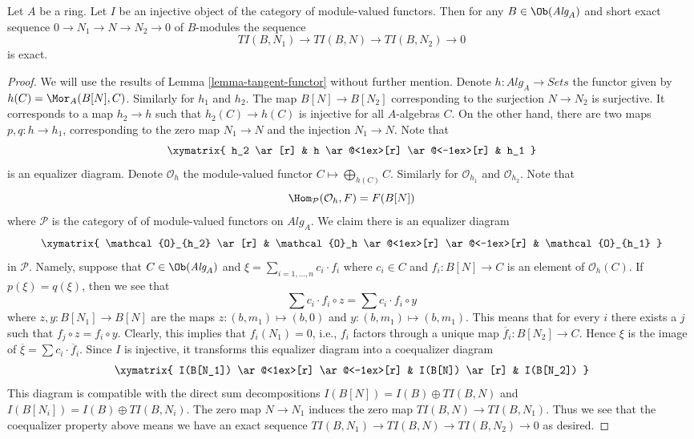 \begin{lemma}
\label{lemma-tangent-injective}
Let $A$ be a ring. Let $I$ be an injective object of the category
of module-valued functors. Then for any $B \in \Ob(\textit{Alg}_A)$
and short exact sequence
$0 \to N_1 \to N \to N_2 \to 0$
of $B$-modules the sequence
$$
TI(B, N_1) \to TI(B, N) \to TI(B, N_2) \to 0
$$
is exact.
\end{lemma}

\begin{proof}
We will use the results of
Lemma \ref{lemma-tangent-functor}
without further mention.
Denote $h : \textit{Alg}_A \to \textit{Sets}$ the functor given by
$h(C) = \Mor_A(B[N], C)$. Similarly for $h_1$ and $h_2$.
The map $B[N] \to B[N_2]$ corresponding to the surjection $N \to N_2$
is surjective. It corresponds to a map $h_2 \to h$ such that
$h_2(C) \to h(C)$ is injective for all $A$-algebras $C$. On the other
hand, there are two maps $p, q : h \to h_1$, corresponding to the
zero map $N_1 \to N$ and the injection $N_1 \to N$. Note that
$$
\xymatrix{
h_2 \ar[r] & h \ar@<1ex>[r] \ar@<-1ex>[r] & h_1
}
$$
is an equalizer diagram. Denote $\mathcal{O}_h$ the module-valued functor
$C \mapsto \bigoplus_{h(C)} C$. Similarly for $\mathcal{O}_{h_1}$ and
$\mathcal{O}_{h_2}$. Note that
$$
\Hom_\mathcal{P}(\mathcal{O}_h, F) = F(B[N])
$$
where $\mathcal{P}$ is the category of of module-valued functors on
$\textit{Alg}_A$. We claim there is an equalizer diagram
$$
\xymatrix{
\mathcal{O}_{h_2} \ar[r] &
\mathcal{O}_h \ar@<1ex>[r] \ar@<-1ex>[r] &
\mathcal{O}_{h_1}
}
$$
in $\mathcal{P}$. Namely, suppose that $C \in \Ob(\textit{Alg}_A)$
and $\xi = \sum_{i = 1, \ldots, n} c_i \cdot f_i$ where $c_i \in C$ and
$f_i : B[N] \to C$ is an element of
$\mathcal{O}_h(C)$. If $p(\xi) = q(\xi)$, then
we see that
$$
\sum c_i \cdot f_i \circ z = \sum c_i \cdot f_i \circ y
$$
where $z, y : B[N_1] \to B[N]$ are the maps $z : (b, m_1) \mapsto (b, 0)$
and $y : (b, m_1) \mapsto (b, m_1)$. This means that for every $i$
there exists a $j$ such that $f_j \circ z = f_i \circ y$. Clearly, this
implies that $f_i(N_1) = 0$, i.e., $f_i$ factors through a unique map
$\overline{f}_i : B[N_2] \to C$. Hence $\xi$ is the image of
$\overline{\xi} = \sum c_i \cdot \overline{f}_i$.
Since $I$ is injective, it transforms this equalizer diagram
into a coequalizer diagram
$$
\xymatrix{
I(B[N_1]) \ar@<1ex>[r] \ar@<-1ex>[r] &
I(B[N]) \ar[r] &
I(B[N_2])
}
$$
This diagram is compatible with the direct sum decompositions
$I(B[N]) = I(B) \oplus TI(B, N)$ and $I(B[N_i]) = I(B) \oplus TI(B, N_i)$.
The zero map $N \to N_1$ induces the zero map $TI(B, N) \to TI(B, N_1)$.
Thus we see that the coequalizer property
above means we have an exact sequence
$TI(B, N_1) \to TI(B, N) \to TI(B, N_2) \to 0$
as desired.
\end{proof}

